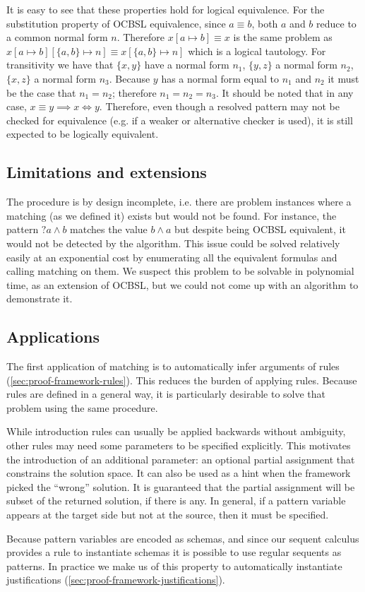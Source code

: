 It is easy to see that these properties hold for logical equivalence. For the substitution property of OCBSL equivalence, since $a \equiv b$, both $a$ and $b$ reduce to a common normal form $n$. Therefore $x[a \mapsto b] \equiv x$ is the same problem as $x[a \mapsto b][\{a, b\} \mapsto n] \equiv x[\{a, b\} \mapsto n]$ which is a logical tautology. For transitivity we have that $\{x, y\}$ have a normal form $n_1$, $\{y, z\}$ a normal form $n_2$, $\{x, z\}$ a normal form $n_3$. Because $y$ has a normal form equal to $n_1$ and $n_2$ it must be the case that $n_1 = n_2$; therefore $n_1 = n_2 = n_3$.
It should be noted that in any case, $x \equiv y \implies x \Leftrightarrow y$. Therefore, even though a resolved pattern may not be checked for equivalence (e.g. if a weaker or alternative checker is used), it is still expected to be logically equivalent.

\subsection{Limitations and extensions}

The procedure is by design incomplete, i.e. there are problem instances where a matching (as we defined it) exists but would not be found. For instance, the pattern ${?a} \land b$ matches the value $b \land a$ but despite being OCBSL equivalent, it would not be detected by the algorithm. This issue could be solved relatively easily at an exponential cost by enumerating all the equivalent formulas and calling matching on them. We suspect this problem to be solvable in polynomial time, as an extension of OCBSL, but we could not come up with an algorithm to demonstrate it.

\subsection{Applications}

The first application of matching is to automatically infer arguments of rules (\autoref{sec:proof-framework-rules}). This reduces the burden of applying rules. Because rules are defined in a general way, it is particularly desirable to solve that problem using the same procedure.

While introduction rules can usually be applied backwards without ambiguity, other rules may need some parameters to be specified explicitly. This motivates the introduction of an additional parameter: an optional partial assignment that constrains the solution space. It can also be used as a hint when the framework picked the ``wrong'' solution. It is guaranteed that the partial assignment will be subset of the returned solution, if there is any. In general, if a pattern variable appears at the target side but not at the source, then it must be specified.

Because pattern variables are encoded as schemas, and since our sequent calculus provides a rule to instantiate schemas it is possible to use regular sequents as patterns. In practice we make us of this property to automatically instantiate justifications (\autoref{sec:proof-framework-justifications}).
